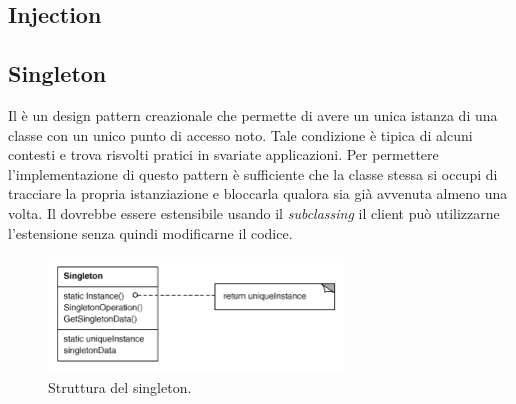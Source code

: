 	
 	
	
	\subsection{Injection} %
	
	\subsection{Singleton} %
	Il  è un design pattern creazionale che permette di avere un unica istanza di una classe con un unico punto di accesso noto. Tale condizione è tipica di alcuni contesti e trova risvolti pratici in svariate applicazioni. Per permettere l'implementazione di questo pattern è sufficiente che la classe stessa si occupi di tracciare la propria istanziazione e bloccarla qualora sia già avvenuta almeno una volta. Il  dovrebbe essere estensibile usando il \emph{subclassing} il client può utilizzarne l'estensione senza quindi modificarne il codice.
	
		\begin{figure}[h]
	\centering \includegraphics[width=0.7\textwidth]{patterns/Singleton.png}
	\caption{Struttura del singleton.}
	\label{fig:singleton}
	\end{figure}
	
